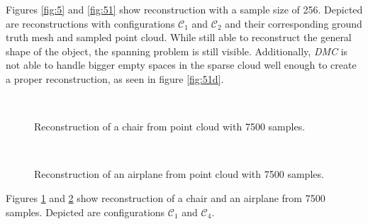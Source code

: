   Figures \ref{fig:5} and \ref{fig:51} show reconstruction with a sample size of 256. Depicted are reconstructions with configurations
  $\mathcal{C}_1$ and $\mathcal{C}_2$ 
  and their corresponding ground truth mesh and sampled point cloud.
  While still able to reconstruct the general shape of the object, the spanning problem is still visible.
  Additionally, \emph{DMC} is not able to handle bigger empty spaces in the sparse cloud well enough to create a proper reconstruction,
  as seen in figure \ref{fig:51d}.


  \begin{figure}[htbp]
    \centering
    \\
    \caption{Reconstruction of a chair from point cloud with 7500 samples.} \label{fig:6}
  \end{figure}
  \begin{figure}[htbp]
    \centering
    \\
    \caption{Reconstruction of an airplane from point cloud with 7500 samples.} \label{fig:61}
  \end{figure}
  
  Figures \ref{fig:6} and \ref{fig:61} show reconstruction of a chair and an airplane from 7500 samples. Depicted are configurations 
  $\mathcal{C}_1$ and $\mathcal{C}_4$.



